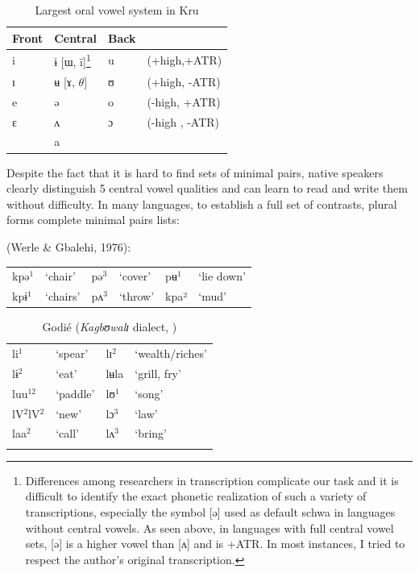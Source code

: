 \documentclass[output=paper
,newtxmath
,modfonts
,nonflat]{langsci/langscibook}
\begin{document}
\begin{table}
\begin{tabular}{llll}

Front  &  Central & Back\\
\midrule
i  &  ɨ [ɯ, ï]\footnote{Differences among researchers in transcription complicate our task and it is difficult to identify the exact phonetic realization of such a variety of transcriptions, especially the symbol [ə] used as default schwa in languages without central vowels. As seen above, in languages with full central vowel sets, [ə] is a higher vowel than [ʌ] and is +ATR. In most instances, I tried to respect the author’s original transcription.} & u  &  (+high,+ATR)\\

ɪ  &  ʉ [ɤ, $\theta $]  & ʊ  &  (+high, -ATR) \\

e  &  ə  &  o  &  (-high, +ATR)\\

ɛ  &  ʌ  &  ɔ  &  (-high , -ATR) \\

& a\\

\end{tabular}	
\caption{Largest oral vowel system in Kru }
\label{tab:zogbo:5}
\end{table}

Despite the fact that it is hard to find  sets of minimal pairs, native speakers clearly distinguish 5 central vowel qualities and can learn to read and write them without difficulty. In many languages, to establish a full set of contrasts, plural forms complete minimal pairs lists: 

\ea {}  (Werle \& Gbalehi, 1976):

\begin{tabular}{llllll}
kpə$^1$ & ‘chair’  &  pə$^3$ &  ‘cover’  &  pʉ$^1$& ‘lie down’\\

kpɨ$^1$ &  ‘chairs’ & pʌ$^3$   & ‘throw’ & kpa²  &  ‘mud’ \\
\end{tabular}
\z

\begin{table}
\begin{tabular}{llll}
\lsptoprule	
li$^1$  &  ‘spear’  &  lɪ$^2$ & ‘wealth/riches’\\

lɨ$^2$  &  ‘eat’  &  lʉla  &  ‘grill, fry’\\

luu$^{12}$ &   ‘paddle’ & lʊ$^1$ & ‘song’\\

lV$^2$lV$^2$ & ‘new’    & lɔ$^3$  &  ‘law’ \\

laa$^2$ & ‘call’ &   lʌ$^3$ &    ‘bring’ \\
\lspbottomrule
\end{tabular}
\caption{Godié (\textit{Kagbʊwalɪ} dialect, \citealt{Association2004})}
\label{tab:zogbo:6}
\end{table}
\end{document}
